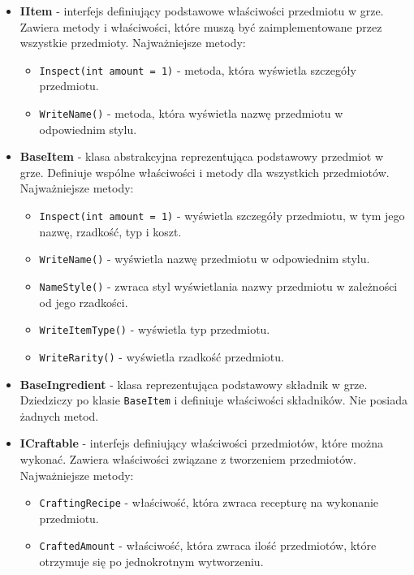 \begin{itemize}
\begin{itemize}
                \end{itemize}
        \item \textbf{IItem} - interfejs definiujący podstawowe właściwości przedmiotu w grze. 
        Zawiera metody i właściwości, które muszą być zaimplementowane przez wszystkie przedmioty. Najważniejsze metody:
            \begin{itemize}
                \item \texttt{Inspect(int amount = 1)} - metoda, która wyświetla szczegóły przedmiotu.
                \item \texttt{WriteName()} - metoda, która wyświetla nazwę przedmiotu w odpowiednim stylu.
            \end{itemize}
        \item \textbf{BaseItem} - klasa abstrakcyjna reprezentująca podstawowy przedmiot w grze. 
        Definiuje wspólne właściwości i metody dla wszystkich przedmiotów. Najważniejsze metody:
            \begin{itemize}
                \item \texttt{Inspect(int amount = 1)} - wyświetla szczegóły przedmiotu, w tym jego nazwę, rzadkość, typ i koszt.
                \item \texttt{WriteName()} - wyświetla nazwę przedmiotu w odpowiednim stylu.
                \item \texttt{NameStyle()} - zwraca styl wyświetlania nazwy przedmiotu w zależności od jego rzadkości.
                \item \texttt{WriteItemType()} - wyświetla typ przedmiotu.
                \item \texttt{WriteRarity()} - wyświetla rzadkość przedmiotu.
            \end{itemize}
        \item \textbf{BaseIngredient} - klasa reprezentująca podstawowy składnik w grze. 
        Dziedziczy po klasie \texttt{BaseItem} i definiuje właściwości składników. Nie posiada żadnych metod.
        \item \textbf{ICraftable} - interfejs definiujący właściwości przedmiotów, które można wykonać. 
        Zawiera właściwości związane z tworzeniem przedmiotów. Najważniejsze metody:
            \begin{itemize}
                \item \texttt{CraftingRecipe} - właściwość, która zwraca recepturę na wykonanie przedmiotu.
                \item \texttt{CraftedAmount} - właściwość, która zwraca ilość przedmiotów, które otrzymuje się po jednokrotnym wytworzeniu.

\end{itemize}
\end{itemize}
